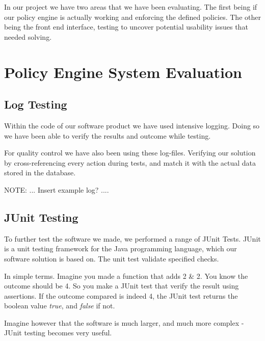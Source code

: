 In our project we have two areas that we have been evaluating. The first being if our policy engine is actually working and enforcing the defined policies. The other being the front end interface, testing to uncover potential usability issues that needed solving.

\section{Policy Engine System Evaluation}
\label{policy-engine-system-evaluation}

\subsection{Log Testing}
\label{log-test}
Within the code of our software product we have used intensive logging. Doing so we have been able to verify the results and outcome while testing.

For quality control we have also been using these log-files. Verifying our solution by cross-referencing every action during tests, and match it with the actual data stored in the database.

NOTE: ... Insert example log? ....



\subsection{JUnit Testing}
To further test the software we made, we performed a range of JUnit Tests. JUnit is a unit testing framework for the Java programming language, which our software solution is based on. The unit test validate specified checks. 

In simple terms. Imagine you made a function that adds 2 \& 2. You know the outcome should be 4. So you make a JUnit test that verify the result using assertions. If the outcome compared is indeed 4, the JUnit test returns the boolean value \textit{true}, and \textit{false} if not.

Imagine however that the software is much larger, and much more complex - JUnit testing becomes very useful.

